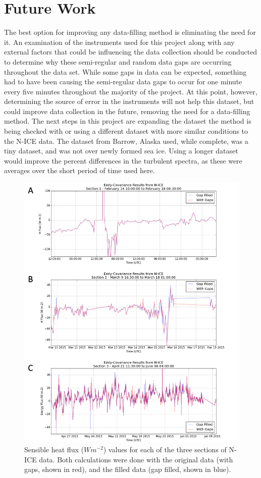  \section{Future Work}
The best option for improving any data-filling method is eliminating the need for it. An examination of the instruments used for this project along with any external factors that could be influencing the data collection should be conducted to determine why these semi-regular and random data gaps are occurring throughout the data set. While some gaps in data can be expected, something had to have been causing the semi-regular data gaps to occur for one minute every five minutes throughout the majority of the project. At this point, however, determining the source of error in the instruments will not help this dataset, but could improve data collection in the future, removing the need for a data-filling method.
The next steps in this project are expanding the dataset the method is being checked with or using a different dataset with more similar conditions to the N-ICE data. The dataset from Barrow, Alaska used, while complete, was a tiny dataset, and was not over newly formed sea ice. Using a longer dataset would improve the percent differences in the turbulent spectra, as these were averages over the short period of time used here. 

  \begin{figure}[h]
    \centering
    \includegraphics[width=1\linewidth]{figures/appendixb/nice_fluxes.png}
    \caption[N-ICE sensible heat flux]{Sensible heat flux ($Wm^{-2}$) values for each of the three sections of N-ICE data. Both calculations were done with the original data (with gaps, shown in red), and the filled data (gap filled, shown in blue).}
    \label{fig:nice_fluxes}
\end{figure}

